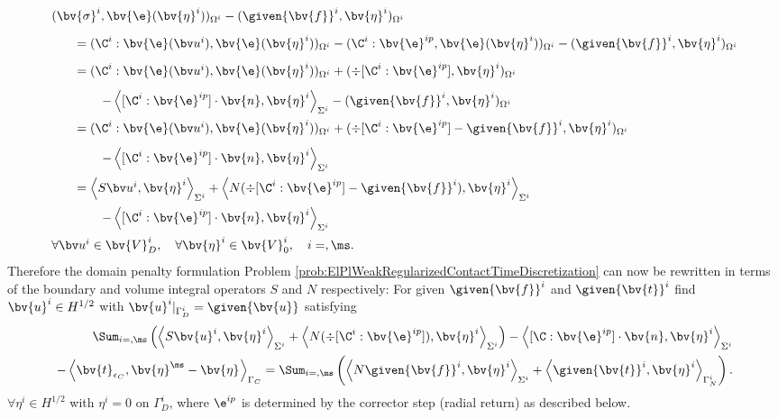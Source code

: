 \begin{equation*}
\begin{array}{l}
(\bv{\sigma}^i,\bv{\e}(\bv{\eta}^i))_{\Omega^i} 
- (\given{\bv{f}}^i, \bv{\eta}^i)_{\Omega^i}\\[2ex]
\qquad = ( \C^i : \bv{\e}(\bv u^i),\bv{\e}(\bv{\eta}^i))_{\Omega^i} 
- (\C^i : \bv{\e}^{ip},\bv{\e}(\bv{\eta}^i))_{\Omega^i} 
- (\given{\bv{f}}^i, \bv{\eta}^i)_{\Omega^i}\\[2ex]
\qquad = ( \C^i : \bv{\e}(\bv u^i),\bv{\e}(\bv{\eta}^i))_{\Omega^i} 
+ (\div [\C^i : \bv{\e}^{ip}], \bv{\eta}^i)_{\Omega^i} \\[2ex]
\qquad \qquad - \left\langle [\C^i : \bv{\e}^{ip}] \cdot \bv{n}, \bv{\eta}^i\right\rangle_{\Sigma^i} 
- (\given{\bv{f}}^i, \bv{\eta}^i)_{\Omega^i}\\[2ex]
\qquad = ( \C^i : \bv{\e}(\bv u^i),\bv{\e}(\bv{\eta}^i))_{\Omega^i} 
+ (\div [\C^i : \bv{\e}^{ip}] - \given{\bv{f}}^i, \bv{\eta}^i)_{\Omega^i} \\[2ex]
\qquad \qquad - \left\langle [\C^i : \bv{\e}^{ip}] \cdot \bv{n}, \bv{\eta}^i\right\rangle_{\Sigma^i} \\[2ex]
\qquad = \left\langle S \bv u^i, \bv{\eta}^i \right\rangle_{\Sigma^i} 
+ \left\langle N (\div [\C^i : \bv{\e}^{ip}] - \given{\bv{f}}^i) , \bv{\eta}^i \right\rangle_{\Sigma^i} \\[2ex]
\qquad \qquad 
- \left\langle [\C^i : \bv{\e}^{ip}] \cdot \bv{n}, \bv{\eta}^i\right\rangle_{\Sigma^i} \\[2ex]
\forall \bv u^i \in \bv{V}^i_D, \quad \forall \bv{\eta}^i \in \bv{V}^i_0, \quad i=\sl,\ms.
\end{array}
\end{equation*}
Therefore the domain penalty formulation Problem \ref{prob:ElPlWeakRegularizedContactTimeDiscretization} can now be rewritten  in terms of the boundary and volume integral operators $S$ and $N$ respectively: For given $\given{\bv{f}}^i$ and $\given{\bv{t}}^i$ find $\bv{u}^i\in H^{1/2}$ with $\bv{u}^i|_{\Gamma^i_D}=\given{\bv{u}}$ satisfying
\begin{equation} \label{eq:WeakForm_BEM}
\begin{array}{r}
\Sum_{i=\sl,\ms}\left(  
\left\langle S \bv{u}^i, \bv{\eta}^i \right\rangle_{\Sigma^i} 
+ \left\langle  N (\div[\C^i : \bv{\e}^{ip}]), \bv{\eta}^i \right\rangle_{\Sigma^i}\right)
- \left\langle [\C : \bv{\e}^{ip}] \cdot \bv{n}, \bv{\eta}^i\right\rangle_{\Sigma^i} \\[2ex]
- \left\langle \bv{t}_{\epsilon_C}, \bv{\eta}^{\ms}-\bv{\eta}^{\sl} \right\rangle_{\Gamma_C} 
= \Sum_{i=\sl,\ms}  \left(
\left\langle N \given{\bv{f}}^i, \bv{\eta}^i \right\rangle_{\Sigma^i}
+ \left\langle \given{\bv{t}}^i, \bv{\eta}^i \right\rangle_{\Gamma_N^i} \right).
\end{array}
\end{equation}
$\forall \eta^i \in H^{1/2}$ with $\eta^i=0$ on $\Gamma^i_D$, where $\e^{ip}$ is determined by the corrector step (radial return) as described below.


